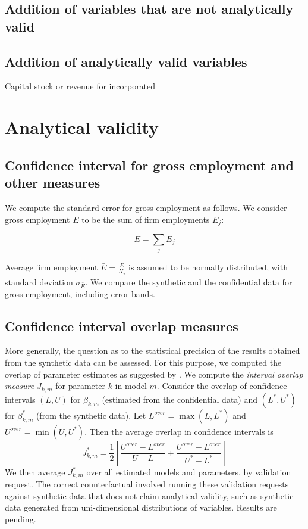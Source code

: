\documentclass{article}
\begin{document}
\subsection{Addition of variables that are not analytically valid}

\subsection{Addition of analytically valid variables}

Capital stock or revenue for incorporated 


\newpage


\section{Analytical validity}

\subsection{Confidence interval for gross employment and other measures}
We compute the standard error for gross employment as follows. We consider gross employment $E$ to be the sum of firm employments $E_j$:

\begin{equation}
E = \sum_j E_j
\end{equation}

Average firm employment $\bar{E} = \frac{E}{N_j}$ is assumed to be normally distributed, with standard deviation $\sigma_{\bar{E}}$. We compare the synthetic and the confidential data for gross employment, including error bands.

\subsection{Confidence interval overlap measures}

More generally, the question as to the statistical precision of the results obtained from the synthetic data can be assessed. For this purpose, we computed the overlap of parameter estimates  as suggested by \cite{tas2006}. We compute the \emph{interval overlap measure} $J_{k,m}$ for parameter $k$ in model $m$. Consider the overlap of confidence intervals $(L,U)$ for $\beta_{k,m}$ (estimated from the confidential data) and $(L^{*},U^{*})$ for $\beta_{k,m}^*$ (from the synthetic data). Let $L^{over} = \max (L,L^{*} )$ and $U^{over} = \min (U,U^{*})$. Then the average overlap in confidence intervals is
$$
J_{k,m}^{*} = \frac{1}{2} \left [ \frac{U^{over} - L^{over}}{U-L} + \frac{U^{over} - L^{over}}{U^*-L ^*}        \right ]
$$
We then average $J_{k,m}^{*}$ over all estimated models and parameters, by validation request. The correct counterfactual involved running these validation requests against synthetic data that does not claim analytical validity, such as synthetic data generated from uni-dimensional distributions of variables. Results are pending.
\end{document}
